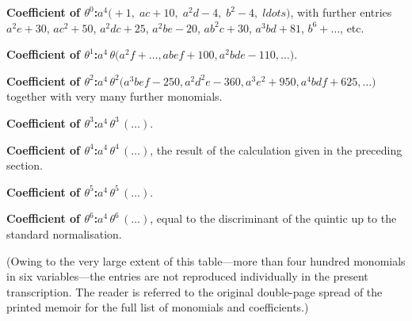 \documentclass[11pt]{article}
\begin{document}
\medskip

\noindent\textbf{Coefficient of $\theta^0$:}\quad $a^4\bigl(+1,\; ac+10,\; a^2 d - 4,\; b^2 - 4,\; ldots\bigr)$, with further entries $a^2 e + 30$, $a c^2 + 50$, $a^2 d c + 25$, $a^2 b e - 20$, $a b^2 c + 30$, $a^3 b d + 81$, $b^6 + \ldots$, etc.

\medskip

\noindent\textbf{Coefficient of $\theta^1$:}\quad $a^4\,\theta\bigl(a^2 f + \ldots, ab e f + 100, a^2 b d e - 110, \ldots\bigr)$.

\medskip

\noindent\textbf{Coefficient of $\theta^2$:}\quad $a^4\,\theta^2 \bigl( a^3 b e f - 250, a^2 d^2 e - 360, a^3 e^2 + 950, a^4 b d f + 625, \ldots \bigr)$ together with very many further monomials.

\medskip

\noindent\textbf{Coefficient of $\theta^3$:}\quad $a^4\,\theta^3\,(\ldots)$.

\medskip

\noindent\textbf{Coefficient of $\theta^4$:}\quad $a^4\,\theta^4\,(\ldots)$, the result of the calculation given in the preceding section.

\medskip

\noindent\textbf{Coefficient of $\theta^5$:}\quad $a^4\,\theta^5\,(\ldots)$.

\medskip

\noindent\textbf{Coefficient of $\theta^6$:}\quad $a^4\,\theta^6\,(\ldots)$, equal to the discriminant of the quintic up to the standard normalisation.

\medskip

\noindent (Owing to the very large extent of this table---more than four hundred monomials in six variables---the entries are not reproduced individually in the present transcription. The reader is referred to the original double-page spread of the printed memoir for the full list of monomials and coefficients.)
\end{document}
